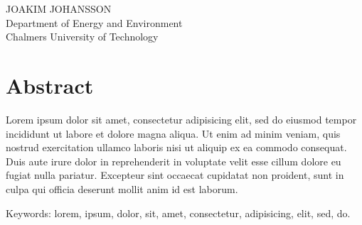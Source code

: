 \reportTitle{}\\
\reportSubTitle{}\\
JOAKIM JOHANSSON\\
Department of Energy and Environment\\
Chalmers University of Technology \setlength{\parskip}{0.5cm}

\thispagestyle{plain}			%
\setlength{\parskip}{0pt plus 1.0pt}
\section*{Abstract}
Lorem ipsum dolor sit amet, consectetur adipisicing elit, sed do eiusmod tempor incididunt ut labore et dolore magna aliqua. Ut enim ad minim veniam, quis nostrud exercitation ullamco laboris nisi ut aliquip ex ea commodo consequat. Duis aute irure dolor in reprehenderit in voluptate velit esse cillum dolore eu fugiat nulla pariatur. Excepteur sint occaecat cupidatat non proident, sunt in culpa qui officia deserunt mollit anim id est laborum.


\vfill
Keywords: lorem, ipsum, dolor, sit, amet, consectetur, adipisicing, elit, sed, do.

\newpage				%
\thispagestyle{empty}
\mbox{}